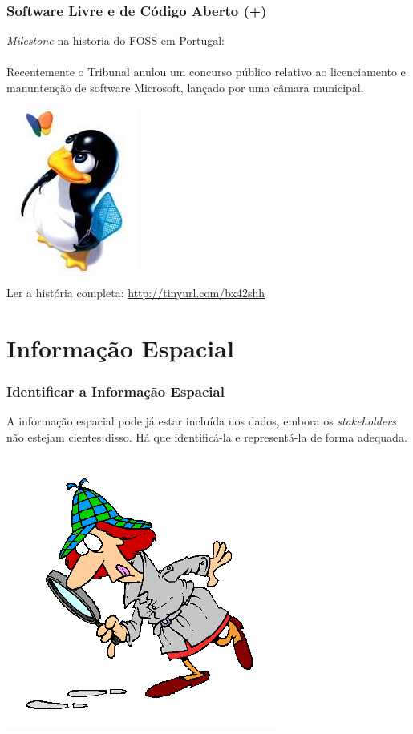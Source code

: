 \documentclass[hyperref={pdfpagelabels=true}]{beamer}
\begin{document}
\begin{frame}
\frametitle{Software Livre e de C\'{o}digo Aberto (+)}

\textit{Milestone} na historia do FOSS em Portugal:
\\~\\
\pause
Recentemente o Tribunal anulou um concurso p\'{u}blico relativo ao licenciamento e manunten\c{c}\~{a}o de software Microsoft, lan\c{c}ado por uma c\^{a}mara municipal.

\includegraphics[scale=0.5]{windows2.jpg}

\small{Ler a hist\'{o}ria completa:
\url{http://tinyurl.com/bx42shh}
}
\end{frame}

\section{Informa\c{c}\~{a}o Espacial}
\begin{frame}
\frametitle{Identificar a Informa\c{c}\~{a}o Espacial}

A informa\c{c}\~{a}o espacial pode j\'{a} estar inclu\'{i}da nos dados, embora os \textit{stakeholders} n\~{a}o estejam cientes disso.
H\'{a} que identific\'{a}-la e represent\'{a}-la de forma adequada.

\includegraphics[scale=0.3]{detective.png}
\end{frame}
\end{document}
